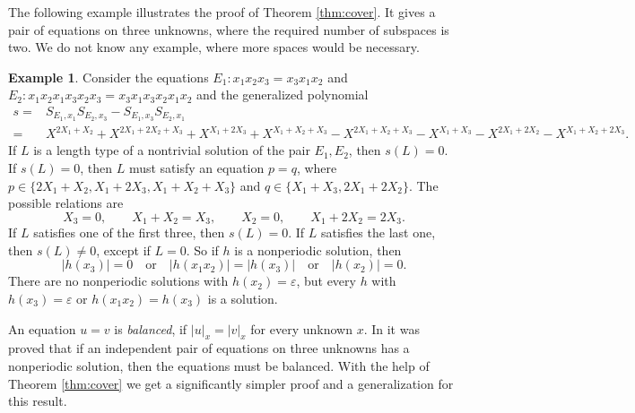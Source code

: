 \documentclass[submission]{eptcs}
\theoremstyle{definition}
\newtheorem{example}[theorem]{Example}
\newcommand{\eps}{\varepsilon}
\newcommand{\sx}[2]{ S_{#1,#2} }
\begin{document}
The following example illustrates the proof of Theorem
\ref{thm:cover}. It gives a pair of equations on three unknowns,
where the required number of subspaces is two. We do not know any
example, where more spaces would be necessary.

\begin{example}
Consider the equations
\begin{math}
    E_1: x_1 x_2 x_3 = x_3 x_1 x_2
\end{math}
and
\begin{math}
    E_2: x_1 x_2 x_1 x_3 x_2 x_3 = x_3 x_1 x_3 x_2 x_1 x_2
\end{math}
and the generalized polynomial
\begin{equation*}
\begin{split}
    s =& \sx{E_1}{x_1} \sx{E_2}{x_3}
        - \sx{E_1}{x_3} \sx{E_2}{x_1} \\
    =& X^{2 X_1 + X_2} + X^{2 X_1 + 2 X_2 + X_3} + X^{X_1 + 2 X_3}
        + X^{X_1 + X_2 + X_3}
    - X^{2 X_1 + X_2 + X_3} - X^{X_1 + X_3}
        - X^{2 X_1 + 2 X_2} - X^{X_1 + X_2 + 2 X_3}.
\end{split}
\end{equation*}
If $L$ is a length type of a nontrivial solution of the pair $E_1,
E_2$, then $s(L) = 0$. If $s(L) = 0$, then $L$ must satisfy an
equation $p = q$, where
\begin{math}
    p \in \{2 X_1 + X_2, X_1 + 2 X_3, X_1 + X_2 + X_3\}
\end{math}
and
\begin{math}
    q \in \{X_1 + X_3, 2 X_1 + 2 X_2\}.
\end{math}
The possible relations are
\begin{equation*}
    X_3 = 0, \qquad
    X_1 + X_2 = X_3, \qquad
    X_2 = 0, \qquad
    X_1 + 2 X_2 = 2 X_3.
\end{equation*}
If $L$ satisfies one of the first three, then $s(L) = 0$. If $L$
satisfies the last one, then $s(L) \ne 0$, except if $L = 0$. So if
$h$ is a nonperiodic solution, then
\begin{equation*}
    |h(x_3)| = 0 \quad \text{or} \quad
    |h(x_1 x_2)| = |h(x_3)| \quad \text{or} \quad
    |h(x_2)| = 0.
\end{equation*}
There are no nonperiodic solutions with $h(x_2) = \eps$, but every
$h$ with $h(x_3) = \eps$ or $h(x_1 x_2) = h(x_3)$ is a solution.
\end{example}

An equation $u = v$ is \emph{balanced}, if $|u|_x = |v|_x$ for every
unknown $x$. In \cite{HaNo03} it was proved that if an independent
pair of equations on three unknowns has a nonperiodic solution, then
the equations must be balanced. With the help of Theorem
\ref{thm:cover} we get a significantly simpler proof and a
generalization for this result.
\end{document}
